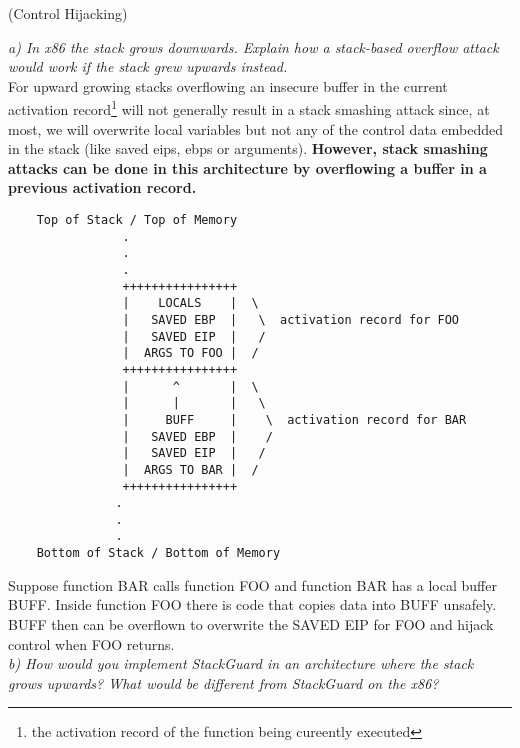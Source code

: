\begin{prob}  (Control Hijacking)
\end{prob}

\noindent \textit{a) In x86 the stack grows downwards. Explain how a stack-based overflow attack would work if the stack grew upwards instead.}\\

\noindent For upward growing stacks overflowing an insecure buffer in the current activation record\footnote{the activation record of the function being cureently executed} will not generally result in a stack smashing attack since, at most, we will overwrite local variables but not any of the control data embedded in the stack (like saved eips,  ebps or arguments). \textbf{However, stack smashing attacks can be done in this architecture by overflowing a buffer in a previous activation record. }
\begin{verbatim}
    Top of Stack / Top of Memory
                .
                .
                .
        		++++++++++++++++
        		|    LOCALS    |  \
        		|   SAVED EBP  |   \  activation record for FOO
        		|   SAVED EIP  |   /
        		|  ARGS TO FOO |  /
        		++++++++++++++++
        		|      ^       |  \
        		|      |       |   \
        		|     BUFF     |    \  activation record for BAR  
        		|   SAVED EBP  |    /  
        		|   SAVED EIP  |   /
        		|  ARGS TO BAR |  /
        		++++++++++++++++
               .
               .
               .
    Bottom of Stack / Bottom of Memory
\end{verbatim}
Suppose function BAR calls function FOO and function BAR has a local buffer BUFF. Inside function FOO there is code that copies data into BUFF unsafely. BUFF then can be overflown to overwrite the SAVED EIP for FOO and hijack control when FOO returns.\\

\noindent \textit{b) How would you implement StackGuard in an architecture where the stack grows upwards? What would be different from StackGuard on the x86?}\\

